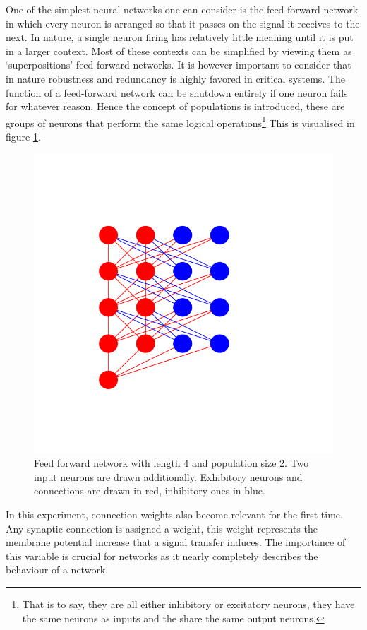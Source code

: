 \documentclass[a4paper,twocolumn]{article}
\begin{document}
One of the simplest neural networks one can consider is the feed-forward
network in which every neuron is arranged so that it passes on the signal it
receives to the next. In nature, a single neuron firing has relatively little
meaning until it is put in a larger context. Most of these contexts can be
simplified by viewing them as `superpositions' feed forward networks. It is
however important to consider that in nature robustness and redundancy is
highly favored in critical systems. The function of a feed-forward network can
be shutdown entirely if one neuron fails for whatever reason. Hence the concept
of populations is introduced, these are groups of neurons that perform the same
logical operations\footnote{That is to say, they are all either inhibitory or
excitatory neurons, they have the same neurons as inputs and the share the same
output neurons.} This is visualised in figure \ref{fig:feed-forward}.

\begin{figure}[ht]
    \centering
    \includegraphics[width=.5\textwidth]{figures/feedforwardnetwork.png}
    \caption{Feed forward network with length 4 and population size 2. Two input
        neurons are drawn additionally. Exhibitory neurons and connections are drawn
        in red, inhibitory ones in blue.}
    \label{fig:feed-forward}
\end{figure}

In this experiment, connection weights also become relevant for the first time.
Any synaptic connection is assigned a weight, this weight represents the
membrane potential increase that a signal transfer induces. The importance of
this variable is crucial for networks as it nearly completely describes the
behaviour of a network.
\end{document}

